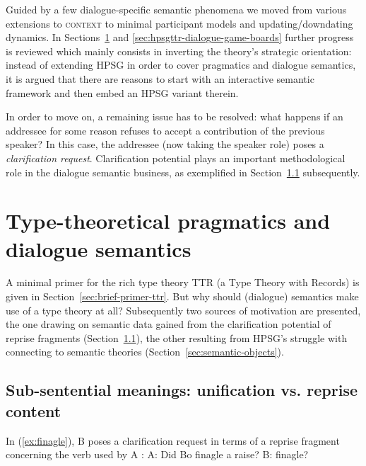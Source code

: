 \documentclass[output=paper]{langsci/langscibook}
\begin{document}
Guided by a few dialogue-specific semantic phenomena we moved from various extensions to \textsc{context}  to minimal participant models and updating/downdating dynamics.
%
In Sections~\ref{sec:type-theory-pragmatics-semantics} and \ref{sec:hpsgttr-dialogue-game-boards} further progress is reviewed which mainly consists in inverting the theory's strategic orientation: instead of extending HPSG in order to cover pragmatics and dialogue semantics, it is argued that there are reasons to start with an interactive semantic framework and then embed an HPSG variant therein.


In order to move on, a remaining issue has to be resolved: what happens if an addressee for some reason refuses to accept a contribution of the previous speaker?
%
In this case, the addressee (now taking the speaker role) poses a \emph{clarification request}. 
%
Clarification potential  plays an important methodological role in the dialogue semantic business, as exemplified in Section~\ref{sec:sub-sentential-meanings} subsequently. 




\section{Type-theoretical pragmatics and dialogue semantics}
\label{sec:type-theory-pragmatics-semantics}

A minimal primer for the rich type theory TTR (a Type Theory with Records) is given in Section~\ref{sec:brief-primer-ttr}. 
%
But why should (dialogue) semantics make use of a type theory at all?
%
Subsequently two sources of motivation are presented, the one drawing on semantic data gained from the clarification potential of reprise fragments (Section~\ref{sec:sub-sentential-meanings}), the other resulting from HPSG's struggle with connecting to semantic theories (Section~\ref{sec:semantic-objects}).



  
\subsection{Sub-sentential meanings: unification vs. reprise content}
\label{sec:sub-sentential-meanings}

In (\ref{ex:finagle}), B poses a clarification request in terms of a reprise fragment concerning the verb used by A \citep[p.~115]{Ginzburg:2012}:
%
\ea \label{ex:finagle}
A: Did Bo finagle a raise? B: finagle?
\z
\end{document}
